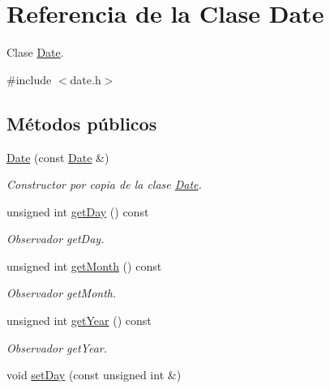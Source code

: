 \hypertarget{class_date}{}\section{Referencia de la Clase Date}
\label{class_date}


Clase \hyperlink{class_date}{Date}.  




{\ttfamily \#include $<$date.\+h$>$}

\subsection*{Métodos públicos}
\begin{DoxyCompactItemize}
\item 
\hyperlink{class_date_afa65693475fb86a2de04c8578b232201}{Date} (const \hyperlink{class_date}{Date} \&)\hypertarget{class_date_afa65693475fb86a2de04c8578b232201}{}\label{class_date_afa65693475fb86a2de04c8578b232201}

\begin{DoxyCompactList}\small\item\em Constructor por copia de la clase \hyperlink{class_date}{Date}. \end{DoxyCompactList}\item 
unsigned int \hyperlink{class_date_a254204c492d3ebc26a2c62d532e34844}{get\+Day} () const 
\begin{DoxyCompactList}\small\item\em Observador get\+Day. \end{DoxyCompactList}\item 
unsigned int \hyperlink{class_date_ac471b901531b7a1e73809918bac8c1ec}{get\+Month} () const 
\begin{DoxyCompactList}\small\item\em Observador get\+Month. \end{DoxyCompactList}\item 
unsigned int \hyperlink{class_date_a6561cf495bd6b7e6c747420d7ae9cc12}{get\+Year} () const 
\begin{DoxyCompactList}\small\item\em Observador get\+Year. \end{DoxyCompactList}\item 
void \hyperlink{class_date_a62b5e19b97adb02367605e3ecf27fc2d}{set\+Day} (const unsigned int \&)\hypertarget{class_date_a62b5e19b97adb02367605e3ecf27fc2d}{}\label{class_date_a62b5e19b97adb02367605e3ecf27fc2d}


\end{DoxyCompactItemize}
